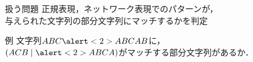 \documentclass[dvipdfmx,12pt,beamer]{standalone}
\begin{document}
\begin{frame}{扱う問題}
  正規表現，ネットワーク表現でのパターンが，\\与えられた文字列の部分文字列にマッチするかを判定

  \begin{block}{例}
    文字列$ABC\alert<2>{ABCA}B$に，\\ 
    $(ACB\mid \alert<2>{ABCA})$がマッチする部分文字列があるか．\\
  \end{block}
\end{frame}
\end{document}
